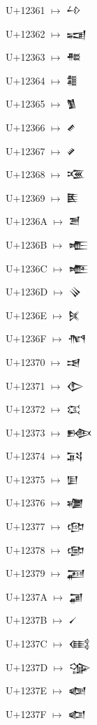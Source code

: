 {\noindent U+12361  $\mapsto$ {\cufont 𒍡}\par
\noindent U+12362  $\mapsto$ {\cufont 𒍢}\par
\noindent U+12363  $\mapsto$ {\cufont 𒍣}\par
\noindent U+12364  $\mapsto$ {\cufont 𒍤}\par
\noindent U+12365  $\mapsto$ {\cufont 𒍥}\par
\noindent U+12366  $\mapsto$ {\cufont 𒍦}\par
\noindent U+12367  $\mapsto$ {\cufont 𒍧}\par
\noindent U+12368  $\mapsto$ {\cufont 𒍨}\par
\noindent U+12369  $\mapsto$ {\cufont 𒍩}\par
\noindent U+1236A  $\mapsto$ {\cufont 𒍪}\par
\noindent U+1236B  $\mapsto$ {\cufont 𒍫}\par
\noindent U+1236C  $\mapsto$ {\cufont 𒍬}\par
\noindent U+1236D  $\mapsto$ {\cufont 𒍭}\par
\noindent U+1236E  $\mapsto$ {\cufont 𒍮}\par
\noindent U+1236F  $\mapsto$ {\cufont 𒍯}\par
\noindent U+12370  $\mapsto$ {\cufont 𒍰}\par
\noindent U+12371  $\mapsto$ {\cufont 𒍱}\par
\noindent U+12372  $\mapsto$ {\cufont 𒍲}\par
\noindent U+12373  $\mapsto$ {\cufont 𒍳}\par
\noindent U+12374  $\mapsto$ {\cufont 𒍴}\par
\noindent U+12375  $\mapsto$ {\cufont 𒍵}\par
\noindent U+12376  $\mapsto$ {\cufont 𒍶}\par
\noindent U+12377  $\mapsto$ {\cufont 𒍷}\par
\noindent U+12378  $\mapsto$ {\cufont 𒍸}\par
\noindent U+12379  $\mapsto$ {\cufont 𒍹}\par
\noindent U+1237A  $\mapsto$ {\cufont 𒍺}\par
\noindent U+1237B  $\mapsto$ {\cufont 𒍻}\par
\noindent U+1237C  $\mapsto$ {\cufont 𒍼}\par
\noindent U+1237D  $\mapsto$ {\cufont 𒍽}\par
\noindent U+1237E  $\mapsto$ {\cufont 𒍾}\par
\noindent U+1237F  $\mapsto$ {\cufont 𒍿}\par
}
